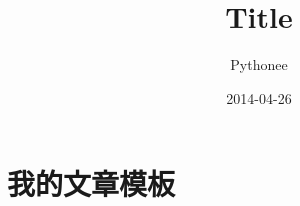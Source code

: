 \documentclass[a4paper,adobefonts]{ctexart}
\author{Pythonee}
\title{Title}
\date{2014-04-26}
\begin{document}
\pagestyle{plain}
\maketitle
\tableofcontents
\section{我的文章模板}
\lipsum
\end{document}
